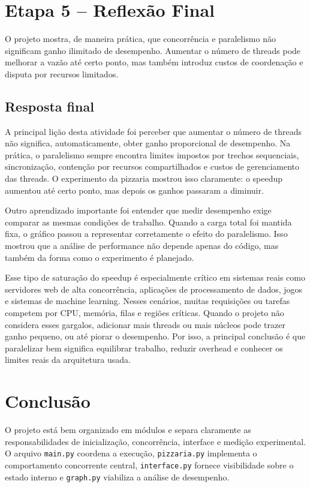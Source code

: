 \documentclass[12pt,a4paper]{article}
\begin{document}
\section{Etapa 5 -- Reflex\~ao Final}
O projeto mostra, de maneira pr\'atica, que concorr\^encia e paralelismo n\~ao significam ganho ilimitado de desempenho. Aumentar o n\'umero de threads pode melhorar a vaz\~ao at\'e certo ponto, mas tamb\'em introduz custos de coordena\c{c}\~ao e disputa por recursos limitados.

\subsection{Resposta final}
A principal li\c{c}\~ao desta atividade foi perceber que aumentar o n\'umero de threads n\~ao significa, automaticamente, obter ganho proporcional de desempenho. Na pr\'atica, o paralelismo sempre encontra limites impostos por trechos sequenciais, sincroniza\c{c}\~ao, conten\c{c}\~ao por recursos compartilhados e custos de gerenciamento das threads. O experimento da pizzaria mostrou isso claramente: o speedup aumentou at\'e certo ponto, mas depois os ganhos passaram a diminuir.

Outro aprendizado importante foi entender que medir desempenho exige comparar as mesmas condi\c{c}\~oes de trabalho. Quando a carga total foi mantida fixa, o gr\'afico passou a representar corretamente o efeito do paralelismo. Isso mostrou que a an\'alise de performance n\~ao depende apenas do c\'odigo, mas tamb\'em da forma como o experimento \'e planejado.

Esse tipo de satura\c{c}\~ao do speedup \'e especialmente cr\'itico em sistemas reais como servidores web de alta concorr\^encia, aplica\c{c}\~oes de processamento de dados, jogos e sistemas de machine learning. Nesses cen\'arios, muitas requisi\c{c}\~oes ou tarefas competem por CPU, mem\'oria, filas e regi\~oes cr\'iticas. Quando o projeto n\~ao considera esses gargalos, adicionar mais threads ou mais n\'ucleos pode trazer ganho pequeno, ou at\'e piorar o desempenho. Por isso, a principal conclus\~ao \'e que paralelizar bem significa equilibrar trabalho, reduzir overhead e conhecer os limites reais da arquitetura usada.

\section{Conclus\~ao}
O projeto est\'a bem organizado em m\'odulos e separa claramente as responsabilidades de inicializa\c{c}\~ao, concorr\^encia, interface e medi\c{c}\~ao experimental. O arquivo \texttt{main.py} coordena a execu\c{c}\~ao, \texttt{pizzaria.py} implementa o comportamento concorrente central, \texttt{interface.py} fornece visibilidade sobre o estado interno e \texttt{graph.py} viabiliza a an\'alise de desempenho.
\end{document}
